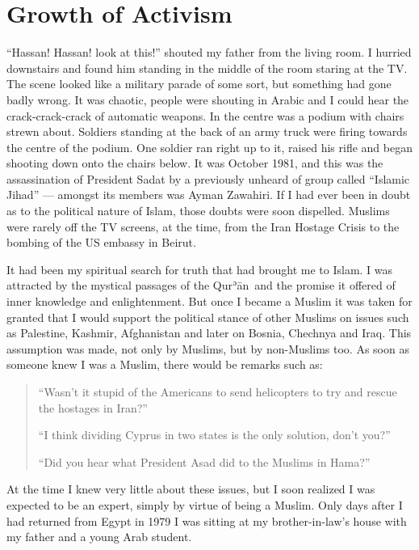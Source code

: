 \documentclass[12pt]{memoir}
\def\´{ʾ} %
\def \Quran{Qur\-\´ān} %
\def\–{-\hskip0pt}
\begin{document}
\chapter{Growth of Activism}


“Hassan! Hassan! look at this!”
shouted my father from the living room.
I hurried downstairs and found him standing
in the middle of the room staring at the TV.
The scene looked like a military parade of some sort,
but something had gone badly wrong.
It was chaotic, people were shouting in Arabic
and I could hear the crack\–crack\–crack of automatic weapons.
In the centre was a podium with chairs strewn about.
Soldiers standing at the back of an army truck
were firing towards the centre of the podium.
One soldier ran right up to it,
raised his rifle and began shooting down onto the chairs below.
It was October 1981, and this was the assassination of President Sadat
by a previously unheard of group called “Islamic Jihad” —
amongst its members was Ayman Zawahiri.
If I had ever been in doubt as to the political nature of Islam,
those doubts were soon dispelled.
Muslims were rarely off the TV screens, at the time,
from the Iran Hostage Crisis to the bombing of the US embassy in Beirut.

It had been my spiritual search for truth that had brought me to Islam.
I was attracted by the mystical passages of the \Quran\
and the promise it offered of inner knowledge and enlightenment.
But once I became a Muslim it was taken for granted that I would support
the political stance of other Muslims on issues such as Palestine,
Kashmir, Afghanistan and later on Bosnia, Chechnya and Iraq.
This assumption was made, not only by Muslims, but by non-Muslims too.
As soon as someone knew I was a Muslim, there would be remarks such as:

\begin{quote}
“Wasn’t it stupid of the Americans to send helicopters
to try and rescue the hostages in Iran?”

“I think dividing Cyprus in two states is the only solution, don’t you?”

“Did you hear what President Asad did to the Muslims in Hama?”
\end{quote}

At the time I knew very little about these issues,
but I soon realized I was expected to be an expert,
simply by virtue of being a Muslim.
Only days after I had returned from Egypt in 1979
I was sitting at my brother-in-law’s house
with my father and a young Arab student.
\end{document}
